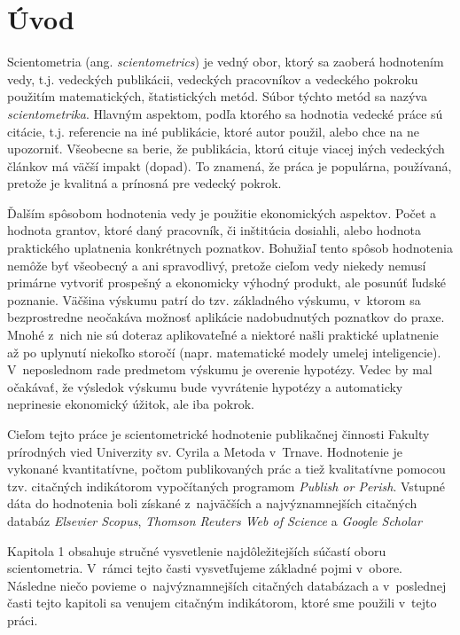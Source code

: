 \chapter*{Úvod}

Scientometria (ang. \emph{scientometrics}) je vedný obor, ktorý sa zaoberá
hodnotením vedy, t.j. vedeckých publikácii, vedeckých pracovníkov a vedeckého
pokroku použitím matematických, štatistických metód.  Súbor týchto metód sa
nazýva \emph{scientometrika}.  Hlavným aspektom, podľa ktorého sa hodnotia
vedecké práce sú citácie, t.j. referencie na iné publikácie, ktoré autor
použil, alebo chce na ne upozorniť.  Všeobecne sa berie, že publikácia, ktorú
cituje viacej iných vedeckých článkov má väčší impakt (dopad).  To znamená, že
práca je populárna, používaná, pretože je kvalitná a prínosná pre vedecký
pokrok.

Ďalším spôsobom hodnotenia vedy je použitie ekonomických aspektov.  Počet a
hodnota grantov, ktoré daný pracovník, či inštitúcia dosiahli, alebo hodnota
praktického uplatnenia konkrétnych poznatkov.  Bohužiaľ tento spôsob hodnotenia
nemôže byť všeobecný a ani spravodlivý, pretože cieľom vedy niekedy nemusí
primárne vytvoriť prospešný a ekonomicky výhodný produkt, ale posunúť ľudské
poznanie.  Väčšina výskumu patrí do tzv.  základného výskumu, v~ktorom sa
bezprostredne neočakáva možnosť aplikácie nadobudnutých poznatkov do praxe.
Mnohé z~nich nie sú doteraz aplikovateľné a niektoré našli praktické uplatnenie
až po uplynutí niekoľko storočí (napr. matematické modely umelej inteligencie).
V~neposlednom rade predmetom výskumu je overenie hypotézy.  Vedec by mal
očakávať, že výsledok výskumu bude vyvrátenie hypotézy a automaticky neprinesie
ekonomický úžitok, ale iba pokrok.  

Cieľom tejto práce je scientometrické hodnotenie publikačnej činnosti Fakulty
prírodných vied Univerzity sv. Cyrila a Metoda v~Trnave.  Hodnotenie je
vykonané kvantitatívne, počtom publikovaných prác a tiež kvalitatívne pomocou
tzv. citačných indikátorom vypočítaných programom \emph{Publish or Perish}.
Vstupné dáta do hodnotenia boli získané z~najväčších a najvýznamnejších
citačných databáz \emph{Elsevier Scopus}, \emph{Thomson Reuters Web of Science}
a \emph{Google Scholar}

Kapitola 1 obsahuje stručné vysvetlenie najdôležitejších súčastí oboru
 scientometria. V~rámci tejto časti vysvetľujeme základné pojmi v~obore.
Následne niečo povieme o~najvýznamnejších citačných databázach a v~poslednej
časti tejto kapitoli sa venujem citačným indikátorom, ktoré sme použili
v~tejto práci.


